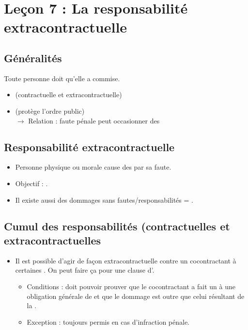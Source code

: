 
\newpage
\chapter{Leçon 7 : La responsabilité extracontractuelle}

\section{Généralités}
Toute personne doit  qu'elle a commise.
\begin{itemize}
	\item {} (contractuelle et extracontractuelle)
	\item {} (protège l'ordre public)\\
	$\rightarrow$ Relation : faute pénale peut occasionner des 
\end{itemize}

\section{Responsabilité extracontractuelle}
\begin{itemize}
	\item Personne physique ou morale cause des  par sa faute.
	\item Objectif : .
	\item Il existe aussi des dommages sans fautes/responsabilités = .
\end{itemize}

\section{Cumul des responsabilités (contractuelles et extracontractuelles}
\begin{itemize}
	\item Il est possible d'agir de façon extracontractuelle contre un cocontractant à certaines . On peut faire ça pour  une clause d'.
	\begin{itemize}
		\item Conditions : doit pouvoir prouver que le cocontractant a fait un  à une obligation générale de  et que le dommage est outre que celui résultant de la .
		\item Exception : toujours permis en cas d'infraction pénale.
 	\end{itemize}
\end{itemize}

